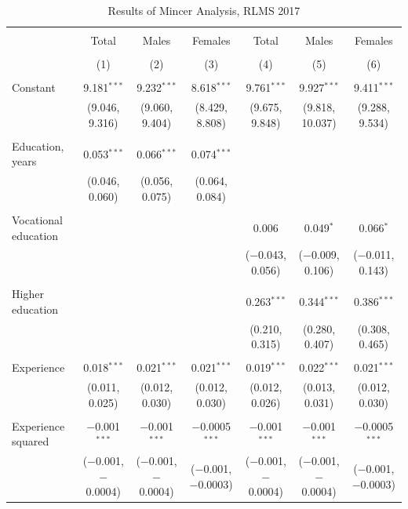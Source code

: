 \documentclass[alpha-refs]{wiley-article-01g}
\begin{document}
\begin{landscape}

\fontsize{9}{11}
\selectfont

\begin{table}[!htbp] \centering 
\renewcommand{\arraystretch}{1.0}
  \caption{Results of Mincer Analysis, RLMS 2017} 
  \label{} 
\begin{tabular}{@{\extracolsep{5pt}}lcccccc} 
\\[-1.8ex]\hline 
\hline \\[-1.8ex] 
 & Total & Males & Females & Total & Males & Females \\ 
\\[-1.8ex] & (1) & (2) & (3) & (4) & (5) & (6)\\ 
\hline \\[-1.8ex] 
 Constant & 9.181$^{***}$ & 9.232$^{***}$ & 8.618$^{***}$ & 9.761$^{***}$ & 9.927$^{***}$ & 9.411$^{***}$ \\ 
  & (9.046, 9.316) & (9.060, 9.404) & (8.429, 8.808) & (9.675, 9.848) & (9.818, 10.037) & (9.288, 9.534) \\ 
  & & & & & & \\ 
 Education, years & 0.053$^{***}$ & 0.066$^{***}$ & 0.074$^{***}$ &  &  &  \\ 
  & (0.046, 0.060) & (0.056, 0.075) & (0.064, 0.084) &  &  &  \\ 
  & & & & & & \\ 
 Vocational education &  &  &  & 0.006 & 0.049$^{*}$ & 0.066$^{*}$ \\ 
  &  &  &  & ($-$0.043, 0.056) & ($-$0.009, 0.106) & ($-$0.011, 0.143) \\ 
  & & & & & & \\ 
 Higher education &  &  &  & 0.263$^{***}$ & 0.344$^{***}$ & 0.386$^{***}$ \\ 
  &  &  &  & (0.210, 0.315) & (0.280, 0.407) & (0.308, 0.465) \\ 
  & & & & & & \\ 
 Experience & 0.018$^{***}$ & 0.021$^{***}$ & 0.021$^{***}$ & 0.019$^{***}$ & 0.022$^{***}$ & 0.021$^{***}$ \\ 
  & (0.011, 0.025) & (0.012, 0.030) & (0.012, 0.030) & (0.012, 0.026) & (0.013, 0.031) & (0.012, 0.030) \\ 
  & & & & & & \\ 
 Experience squared & $-$0.001$^{***}$ & $-$0.001$^{***}$ & $-$0.0005$^{***}$ & $-$0.001$^{***}$ & $-$0.001$^{***}$ & $-$0.0005$^{***}$ \\ 
  & ($-$0.001, $-$0.0004) & ($-$0.001, $-$0.0004) & ($-$0.001, $-$0.0003) & ($-$0.001, $-$0.0004) & ($-$0.001, $-$0.0004) & ($-$0.001, $-$0.0003) \\ 

\end{tabular}
\end{table}
\end{landscape}
\end{document}
